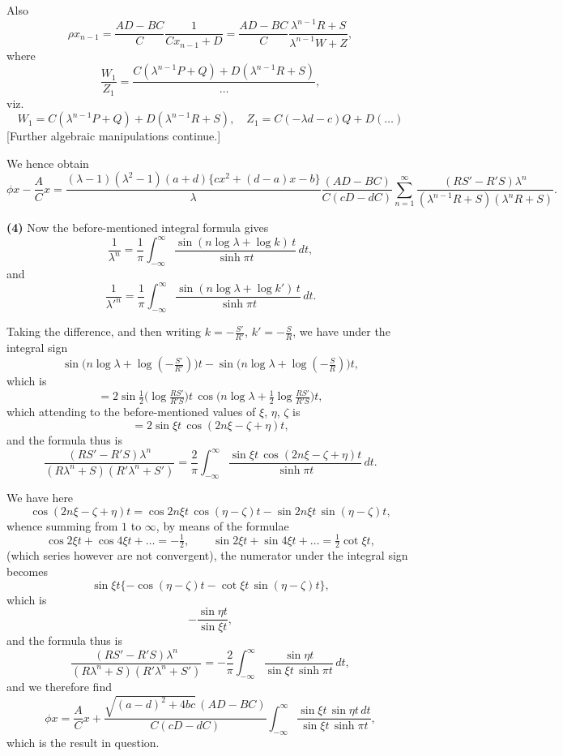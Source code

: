 \documentclass[12pt,a4paper]{article}
\theoremstyle{definition}
\begin{document}
Also
\[
\rho x_{n-1} = \frac{AD - BC}{C}\frac{1}{Cx_{n-1} + D}
= \frac{AD - BC}{C}\frac{\lambda^{n-1}R + S}{\lambda^{n-1}W + Z},
\]
where
\[
\frac{W_1}{Z_1} = \frac{C(\lambda^{n-1}P + Q) + D(\lambda^{n-1}R + S)}{\dots},
\]
viz.
\[
W_1 = C(\lambda^{n-1}P + Q) + D(\lambda^{n-1}R + S),\quad Z_1 = C(-\lambda d - c)Q + D(\dots)
\]
[Further algebraic manipulations continue.]

We hence obtain
\[
\phi x - \frac{A}{C}x = \frac{(\lambda - 1)(\lambda^2 - 1)(a + d)\{cx^2 + (d - a)x - b\}}
{\lambda}\frac{(AD - BC)}{C(cD - dC)}
\sum_{n=1}^{\infty} \frac{(RS' - R'S)\lambda^n}{(\lambda^{n-1}R + S)(\lambda^n R + S)}.
\]

\medskip
\noindent\textbf{(4)}\quad
Now the before-mentioned integral formula gives
\[
\frac{1}{\lambda^n} = \frac{1}{\pi}\int_{-\infty}^{\infty} \frac{\sin(n\log\lambda + \log k)\,t}{\sinh\pi t}\,dt,
\]
and
\[
\frac{1}{\lambda'^n} = \frac{1}{\pi}\int_{-\infty}^{\infty} \frac{\sin(n\log\lambda + \log k')\,t}{\sinh\pi t}\,dt.
\]

Taking the difference, and then writing $k = -\frac{S'}{R'}$, $k' = -\frac{S}{R}$, we have under the integral sign
\[
\sin\bigl(n\log\lambda + \log(-\tfrac{S'}{R'})\bigr)t - \sin\bigl(n\log\lambda + \log(-\tfrac{S}{R})\bigr)t,
\]
which is
\[
= 2\sin\tfrac{1}{2}\bigl(\log\tfrac{RS'}{R'S}\bigr)t\,\cos\bigl(n\log\lambda + \tfrac{1}{2}\log\tfrac{RS'}{R'S}\bigr)t,
\]
which attending to the before-mentioned values of $\xi$, $\eta$, $\zeta$ is
\[
= 2\sin\xi t\,\cos(2n\xi - \zeta + \eta)t,
\]
and the formula thus is
\[
\frac{(RS' - R'S)\lambda^n}{(R\lambda^n + S)(R'\lambda^n + S')}
= \frac{2}{\pi}\int_{-\infty}^{\infty} \frac{\sin\xi t\,\cos(2n\xi - \zeta + \eta)t}{\sinh\pi t}\,dt.
\]

We have here
\[
\cos(2n\xi - \zeta + \eta)t = \cos 2n\xi t\,\cos(\eta - \zeta)t - \sin 2n\xi t\,\sin(\eta - \zeta)t,
\]
whence summing from $1$ to $\infty$, by means of the formulae
\[
\cos 2\xi t + \cos 4\xi t + \dots = -\tfrac{1}{2},\qquad
\sin 2\xi t + \sin 4\xi t + \dots = \tfrac{1}{2}\cot\xi t,
\]
(which series however are not convergent), the numerator under the integral sign becomes
\[
\sin\xi t\{-\cos(\eta - \zeta)t - \cot\xi t\,\sin(\eta - \zeta)t\},
\]
which is
\[
-\frac{\sin\eta t}{\sin\xi t},
\]
and the formula thus is
\[
\frac{(RS' - R'S)\lambda^n}{(R\lambda^n + S)(R'\lambda^n + S')}
= -\frac{2}{\pi}\int_{-\infty}^{\infty} \frac{\sin\eta t}{\sin\xi t\,\sinh\pi t}\,dt,
\]
and we therefore find
\[
\phi x = \frac{A}{C}x + \frac{\sqrt{(a-d)^2 + 4bc}\,(AD - BC)}{C(cD - dC)}
\int_{-\infty}^{\infty} \frac{\sin\xi t\,\sin\eta t\,dt}{\sin\xi t\,\sinh\pi t},
\]
which is the result in question.
\end{document}
